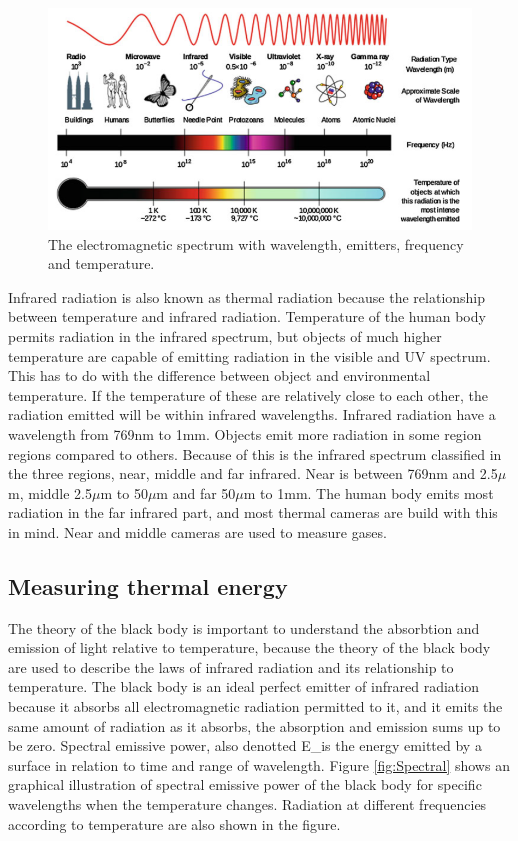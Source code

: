 \begin{figure}[H]                                         
	\includegraphics[width=.66\textwidth]{figures/em_spectrum}  
	\caption{The electromagnetic spectrum with wavelength, emitters, frequency and temperature.\cite{ignacio2017}}
	\label{fig:em_spectrum}  
\end{figure}   

Infrared radiation is also known as thermal radiation because the relationship between temperature and infrared radiation. Temperature of the human body permits radiation in the infrared spectrum, but objects of much higher temperature are capable of emitting radiation in the visible and UV spectrum. This has to do with the difference between object and environmental temperature. If the temperature of these are relatively close to each other, the radiation emitted will be within infrared wavelengths. Infrared radiation have a wavelength from 769nm to 1mm. Objects emit more radiation in some region regions compared to others. Because of this is the infrared spectrum classified in the three regions, near, middle and far infrared. Near is between 769nm and 2.5$\mu$m, middle 2.5$\mu$m to 50$\mu$m and far 50$\mu$m to 1mm. The human body emits most radiation in the far infrared part, and most thermal cameras are build with this in mind. Near and middle cameras are used to measure gases.\cite{ignacio2017} 


\subsection{Measuring thermal energy}

The theory of the black body is important to understand the absorbtion and emission of light relative to temperature, because the theory of the black body are used to describe the laws of infrared radiation and its relationship to temperature. The black body is an ideal perfect emitter of infrared radiation because it absorbs all electromagnetic radiation permitted to it, and it emits the same amount of radiation as it absorbs, the absorption and emission sums up to be zero. 
Spectral emissive power, also denotted E_\lambda is the energy emitted by a surface in relation to time and range of wavelength. Figure \ref{fig:Spectral} shows an graphical illustration of spectral emissive power of the black body for specific wavelengths when the temperature changes. Radiation at different frequencies according to temperature are also shown in the figure. 

